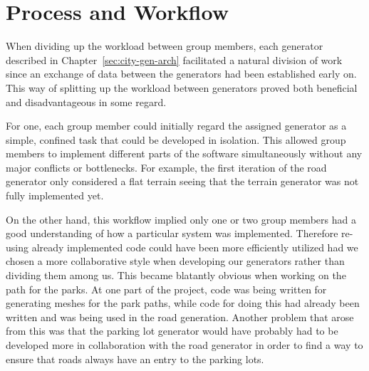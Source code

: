 \section{Process and Workflow}
When dividing up the workload between group members, each generator described in Chapter~\ref{sec:city-gen-arch} facilitated a natural division of work since an exchange of data between the generators had been established early on.
This way of splitting up the workload between generators proved both beneficial and disadvantageous in some regard.

For one, each group member could initially regard the assigned generator as a simple, confined task that could be developed in isolation.
This allowed group members to implement different parts of the software simultaneously without any major conflicts or bottlenecks.
For example, the first iteration of the road generator only considered a flat terrain seeing that the terrain generator was not fully implemented yet.

On the other hand, this workflow implied only one or two group members had a good understanding of how a particular system was implemented.
Therefore re-using already implemented code could have been more efficiently utilized had we chosen a more collaborative style when developing our generators rather than dividing them among us.
This became blatantly obvious when working on the path for the parks.
At one part of the project, code was being written for generating meshes for the park paths, while code for doing this had already been written and was being used in the road generation. 
Another problem that arose from this was that the parking lot generator would have probably had to be developed more in collaboration with the road generator in order to find a way to ensure that roads always have an entry to the parking lots.

